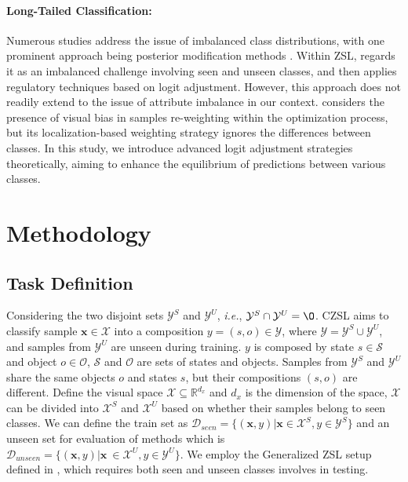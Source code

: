 \documentclass[letterpaper]{article} %
\newcommand{\mx}{\mathbf{x}}
\newcommand{\ie}{\textit{i.e.}}
\theoremstyle{definition}
\begin{document}
\paragraph{Long-Tailed Classification:} Numerous studies address the issue of imbalanced class distributions, with one prominent approach being posterior modification methods \cite{long1, long3, hou2021detecting, menon2020long, focal}. Within ZSL, \citet{chen2022zero} regards it as an imbalanced challenge involving seen and unseen classes, and then applies regulatory techniques based on logit adjustment. However, this approach does not readily extend to the issue of attribute imbalance in our context. \citet{jiang2022mutual} considers the presence of visual bias in samples re-weighting within the optimization process, but its localization-based weighting strategy ignores the differences between classes. In this study, we introduce advanced logit adjustment strategies theoretically, aiming to enhance the equilibrium of predictions between various classes.
 

\section{Methodology}\label{Sec.methodology}

\subsection{Task Definition} \label{subsec.taskdefine}
Considering the two disjoint sets $\mathcal{Y}^S$ and $\mathcal{Y}^U$, \ie, $\mathcal{Y}^S \cap \mathcal{Y}^U = \O$. CZSL aims to classify sample $\mx \in \mathcal{X}$ into a composition $y=(s,o) \in \mathcal{Y}$, where $\mathcal{Y} = \mathcal{Y}^S \cup \mathcal{Y}^U$, and samples from $\mathcal{Y}^U$ are unseen during training. $y$ is composed by state $s\in \mathcal{S}$ and object $o \in \mathcal{O}$, $\mathcal{S}$ and $\mathcal{O}$ are sets of states and objects. Samples from $\mathcal{Y}^S$ and $\mathcal{Y}^{U}$ share the same objects $o$ and states $s$, but their compositions $(s,o)$ are different. Define the visual space $\mathcal{X}\subseteq \mathbb{R}^{d_x}$ and $d_x$ is the dimension of the space, $\mathcal{X}$ can be divided into $\mathcal{X}^S$ and $\mathcal{X}^U$ based on whether their samples belong to seen classes. We can define the train set as $\mathcal{D}_{seen}=\{(\mx,y) | \mx \in \mathcal{X}^S, y \in \mathcal{Y}^S \}$ and an unseen set for evaluation of methods which is $\mathcal{D}_{unseen}=\{(\mx,y)|\mx\ \in \mathcal{X}^U,y\in \mathcal{Y}^U\}$. We employ the Generalized ZSL setup defined in \citet{xian2017zero}, which requires both seen and unseen classes involves in testing.
\end{document}
